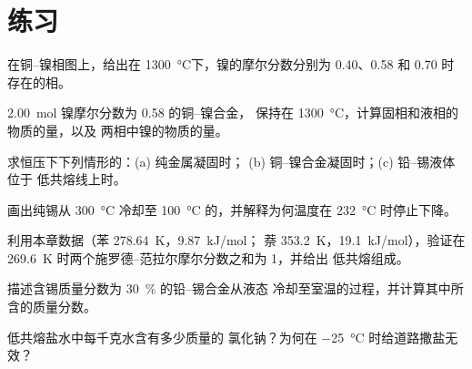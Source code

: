 \section{练习}

\begin{exercise}[$\star$]\label{exo:b2:solid-liquid-diagrams:1}
在铜–镍相图上，给出在
\qty{1300}{\degreeCelsius}下，镍的摩尔分数分别为 0.40、0.58 和 0.70 时存在的相。
\end{exercise}

\begin{exercise}[$\star$]\label{exo:b2:solid-liquid-diagrams:2}
\qty{2.00}{mol} 镍摩尔分数为 0.58 的铜–镍合金，
保持在 \qty{1300}{\degreeCelsius}，计算固相和液相的物质的量，以及
两相中镍的物质的量。
\end{exercise}

\begin{exercise}[$\star$]\label{exo:b2:solid-liquid-diagrams:3}
求恒压下下列情形的：(a) 纯金属凝固时；
(b) 铜–镍合金凝固时；(c) 铅–锡液体位于
低共熔线上时。
\end{exercise}

\begin{exercise}[$\star$]\label{exo:b2:solid-liquid-diagrams:4}
画出纯锡从 \qty{300}{\degreeCelsius} 冷却至
\qty{100}{\degreeCelsius} 的，并解释为何温度在
\qty{232}{\degreeCelsius} 时停止下降。
\end{exercise}

\begin{exercise}[$\star\star$]\label{exo:b2:solid-liquid-diagrams:5}
利用本章数据（苯 \qty{278.64}{K}，\qty{9.87}{kJ/mol}；
萘 \qty{353.2}{K}，\qty{19.1}{kJ/mol}），验证在
\qty{269.6}{K} 时两个施罗德–范拉尔摩尔分数之和为 1，并给出
低共熔组成。
\end{exercise}

\begin{exercise}[$\star\star$]\label{exo:b2:solid-liquid-diagrams:6}
描述含锡质量分数为 30~\% 的铅–锡合金从液态
冷却至室温的过程，并计算其中所含的质量分数。
\end{exercise}

\begin{exercise}[$\star\star$]\label{exo:b2:solid-liquid-diagrams:7}
低共熔盐水中每千克水含有多少质量的
氯化钠？为何在 \qty{-25}{\degreeCelsius} 时给道路撒盐无效？
\end{exercise}

